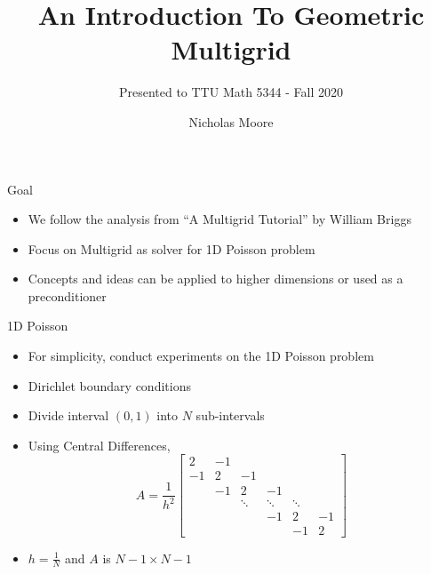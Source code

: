 \documentclass[11pt]{beamer}
\title{An Introduction To Geometric Multigrid}
\subtitle{Presented to TTU Math 5344 - Fall 2020}
\author{Nicholas Moore}
\date{}
\begin{document}
\frame{\titlepage}
\begin{frame}{Goal}
  \begin{itemize}
  \item We follow the analysis from ``A Multigrid Tutorial'' by William Briggs
  \item Focus on Multigrid as solver for 1D Poisson problem
  \item Concepts and ideas can be applied to higher dimensions or used as a
    preconditioner
  \end{itemize}
\end{frame}
\begin{frame}{1D Poisson}
  \begin{itemize}
  \item For simplicity, conduct experiments on the 1D Poisson problem
  \item Dirichlet boundary conditions
  \item Divide interval $(0,1)$ into $N$ sub-intervals
  \item Using Central Differences,\[
      A = \frac{1}{h^2}
      \begin{bmatrix}
        2  & -1 &        &        &        &   \\
        -1 &  2 & -1     &        &        &   \\
        & -1 &  2     &     -1 &        &   \\
        &    & \ddots & \ddots & \ddots &   \\
        &    &        &     -1 &      2 & -1 \\
        &    &        &        &     -1 &  2
      \end{bmatrix}
    \] 
  \item $h = \frac{1}{N}$ and $A$ is $N-1 \times N-1$
  \end{itemize}
\end{frame}
\end{document}
